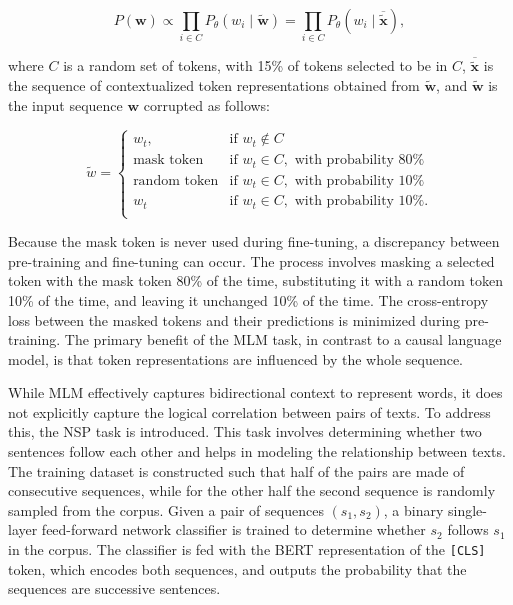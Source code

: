 \begin{equation}
    P(\bm{w}) \propto \prod_{i \in C} P_{\theta} \left(w_i \mid \tilde{\bm{w}}\right) = \prod_{i \in C} P_{\theta} \left(w_i \mid \overline{\tilde{\bm{x}}}\right) ,
\end{equation}

\noindent where $C$ is a random set of tokens, with 15\% of tokens selected to be in $C$, $\overline{\tilde{\bm{x}}}$ is the sequence of contextualized token representations obtained from $\tilde{\bm{w}}$, and $\tilde{\bm{w}}$ is the input sequence $\bm{w}$ corrupted as follows:

\begin{equation}
    \tilde{w} = 
\begin{cases}
    w_t,               & \text{if } w_t \notin C\\
    \text{mask token}       & \text{if } w_t \in C, \text{ with probability 80\%} \\
    \text{random token}       & \text{if } w_t \in C, \text{ with probability 10\%} \\
    w_t       & \text{if } w_t \in C, \text{ with probability 10\%.} \\
\end{cases}
\end{equation}

\noindent Because the mask token is never used during fine-tuning, a discrepancy between pre-training and fine-tuning can occur. The process involves masking a selected token with the mask token 80\% of the time, substituting it with a random token 10\% of the time, and leaving it unchanged 10\% of the time. The cross-entropy loss between the masked tokens and their predictions is minimized during pre-training. The primary benefit of the \ac{MLM} task, in contrast to a causal language model, is that token representations are influenced by the whole sequence.

While \ac{MLM} effectively captures bidirectional context to represent words, it does not explicitly capture the logical correlation between pairs of texts. To address this, the \ac{NSP} task is introduced. This task involves determining whether two sentences follow each other and helps in modeling the relationship between texts. The training dataset is constructed such that half of the pairs are made of consecutive sequences, while for the other half the second sequence is randomly sampled from the corpus. Given a pair of sequences $(s_1, s_2)$, a binary single-layer feed-forward network classifier is trained to determine whether $s_2$ follows $s_1$ in the corpus. The classifier is fed with the \ac{BERT} representation of the \texttt{[CLS]} token, which encodes both sequences, and outputs the probability that the sequences are successive sentences. 


